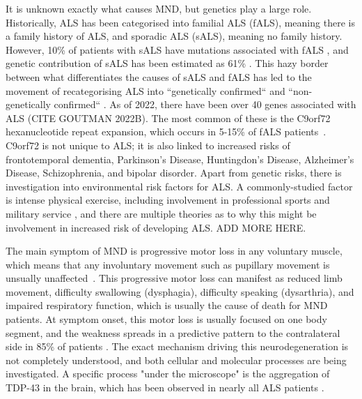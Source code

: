 It is unknown exactly what causes MND, but genetics play a large role. Historically, ALS has been categorised into familial ALS (fALS), meaning there is a family history of ALS, and sporadic ALS (sALS), meaning no family history. However, 10\% of patients with sALS have mutations associated with fALS \cite{hanbyRiskRelativesPatients2011}, and genetic contribution of sALS has been estimated as 61\% \cite{al-chalabiEstimateAmyotrophicLateral2010}. This hazy border between what differentiates the causes of sALS and fALS has led to the movement of recategorising ALS into ``genetically confirmed`` and ``non-genetically confirmed`` \cite{feldmanAmyotrophicLateralSclerosis2022}.
As of 2022, there have been over 40 genes associated with ALS (CITE GOUTMAN 2022B). The most common of these is the C9orf72 hexanucleotide repeat expansion, which occurs in 5-15\% of fALS patients~\cite{vanesAmyotrophicLateralSclerosis2017}. C9orf72 is not unique to ALS; it is also linked to increased risks of frontotemporal dementia, Parkinson's Disease, Huntingdon's Disease, Alzheimer's Disease, Schizophrenia, and bipolar disorder.
Apart from genetic risks, there is investigation into environmental risk factors for ALS. A commonly-studied factor is intense physical exercise, including involvement in professional sports and military service \cite{mckayMilitaryServiceRelated2021, lacortePhysicalActivityPhysical2016}, and there are multiple theories as to why this might be involvement in increased risk of developing ALS. ADD MORE HERE.

The main symptom of MND is progressive motor loss in any voluntary muscle, which means that any involuntary movement such as pupillary movement is unsually unaffected~\cite{vanesAmyotrophicLateralSclerosis2017}. This progressive motor loss can manifest as reduced limb movement, difficulty swallowing (dysphagia), difficulty speaking (dysarthria), and impaired respiratory function, which is usually the cause of death for MND patients. At symptom onset, this motor loss is usually focused on one body segment, and the weakness spreads in a predictive pattern to the contralateral side in 85\% of patients \cite{walhoutPatternsSymptomDevelopment2018}. The exact mechanism driving this neurodegeneration is not completely understood, and both cellular and molecular processes are being investigated. A specific process "under the microscope" is the aggregation of TDP-43 in the brain, which has been observed in nearly all ALS patients \cite{blokhuisProteinAggregationAmyotrophic2013}.

